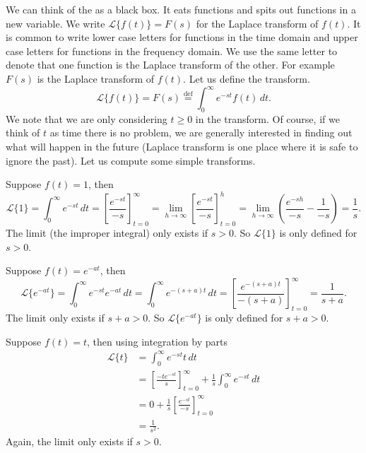 We can think of the \emph{} as a black box.  It
eats functions and spits out functions in a new variable.  We write
$\mathcal{L} \bigl\{ f(t) \bigr\} = F(s)$ for the Laplace transform of $f(t)$.
It is common to write lower case letters for
functions in the time domain and upper case letters for functions in the
frequency domain.  We use the same letter to denote that one function
is the Laplace transform of the other.  For example $F(s)$ is the Laplace
transform of $f(t)$.  Let us define the transform.
\begin{equation*}
\mathcal{L} \bigl\{ f(t) \bigr\} =
F(s) \overset{\text{def}}{=} \int_0^\infty e^{-st} f(t) \, dt .
\end{equation*}
We note that we are only considering $t \geq 0$ in the transform.  Of course,
if we think of $t$ as time there is no problem, we are generally interested in
finding out what will happen in the future (Laplace transform is one place
where it is safe to ignore the past).  Let us compute some simple
transforms.

\begin{example}
Suppose $f(t) = 1$, then
\begin{equation*}
\mathcal{L} \{1\} = \int_0^\infty e^{-st} \, dt
=
\left[ \frac{e^{-st}}{-s} \right]_{t=0}^\infty
=
\lim_{h\to\infty}
\left[ \frac{e^{-st}}{-s} \right]_{t=0}^h
=
\lim_{h\to\infty}
\left( \frac{e^{-sh}}{-s} - \frac{1}{-s} \right)
= \frac{1}{s} .
\end{equation*}
The limit (the improper integral) only exists if $s > 0$.  So 
$\mathcal{L} \{1\}$ is only defined for $s > 0$.
\end{example}

\begin{example}
Suppose $f(t) = e^{-at}$, then
\begin{equation*}
\mathcal{L} \bigl\{e^{-at}\bigr\}
= \int_0^\infty e^{-st} e^{-at} \, dt
= \int_0^\infty e^{-(s+a)t} \, dt
=
\left[ \frac{e^{-(s+a)t}}{-(s+a)} \right]_{t=0}^\infty
= \frac{1}{s+a} .
\end{equation*}
The limit only exists if $s+a > 0$.  So 
$\mathcal{L} \bigl\{e^{-at}\bigr\}$ is only defined for $s+a > 0$.
\end{example}

\begin{example}
Suppose $f(t) = t$, then using integration by parts
\begin{equation*}
\begin{split}
\mathcal{L} \{t\}
& = \int_0^\infty e^{-st} t \, dt \\
& =
\left[ \frac{-te^{-st}}{s} \right]_{t=0}^\infty
+
\frac{1}{s}
\int_0^\infty e^{-st} \,dt \\
& =
0
+
\frac{1}{s}
\left[ \frac{e^{-st}}{-s} \right]_{t=0}^\infty \\
& =
\frac{1}{s^2} .
\end{split}
\end{equation*}
Again, the limit only exists if $s > 0$.
\end{example}

